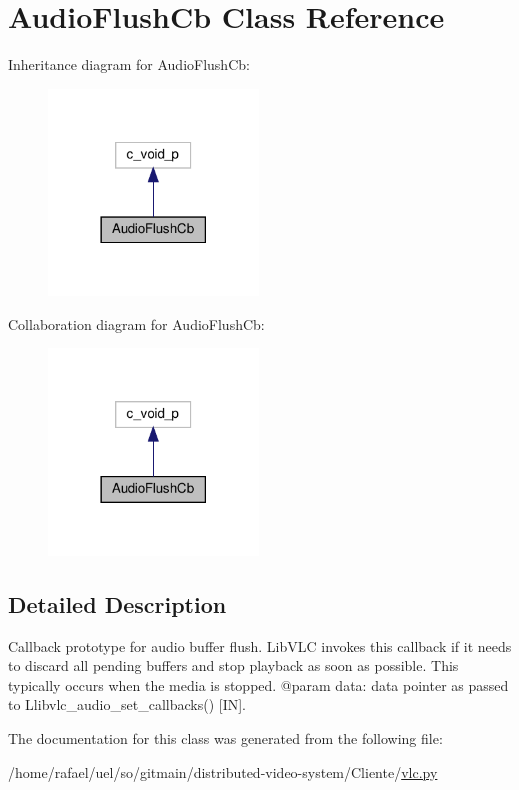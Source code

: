 \hypertarget{classvlc_1_1_audio_flush_cb}{}\section{Audio\+Flush\+Cb Class Reference}
\label{classvlc_1_1_audio_flush_cb}


Inheritance diagram for Audio\+Flush\+Cb\+:
\nopagebreak
\begin{figure}[H]
\begin{center}
\leavevmode
\includegraphics[width=158pt]{classvlc_1_1_audio_flush_cb__inherit__graph}
\end{center}
\end{figure}


Collaboration diagram for Audio\+Flush\+Cb\+:
\nopagebreak
\begin{figure}[H]
\begin{center}
\leavevmode
\includegraphics[width=158pt]{classvlc_1_1_audio_flush_cb__coll__graph}
\end{center}
\end{figure}


\subsection{Detailed Description}
\begin{DoxyVerb}Callback prototype for audio buffer flush.
LibVLC invokes this callback if it needs to discard all pending buffers and
stop playback as soon as possible. This typically occurs when the media is
stopped.
@param data: data pointer as passed to L{libvlc_audio_set_callbacks}() [IN].
\end{DoxyVerb}
 

The documentation for this class was generated from the following file\+:\begin{DoxyCompactItemize}
\item 
/home/rafael/uel/so/gitmain/distributed-\/video-\/system/\+Cliente/\hyperlink{vlc_8py}{vlc.\+py}\end{DoxyCompactItemize}

